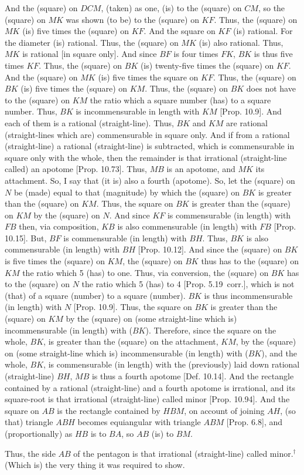 \begin{Parallel}{}{}
{And the (square) on $DCM$, (taken) as one,  (is)  to the (square) on $CM$, so the (square) on $MK$ was shown (to be) to the (square) on 
$KF$.  Thus, the (square) on $MK$ (is) five times the (square) on 
$KF$. And the square on $KF$ (is) rational. For the diameter
(is) rational. Thus, the (square) on $MK$ (is) also rational. 
Thus, $MK$ is rational [in square only]. And since $BF$ is four times
$FK$, $BK$ is thus five times $KF$. Thus, the (square) on $BK$
(is) twenty-five times the (square) on $KF$.  And the (square) on $MK$
(is) five times the square on $KF$. Thus, the (square) on $BK$ (is) five
times the (square) on $KM$.  Thus, the (square) on $BK$ does not
have to the (square) on $KM$ the ratio which a square number (has) to
a square number. Thus, $BK$ is incommensurable in length with $KM$ [Prop. 10.9].
And each of them is a rational (straight-line).  Thus, $BK$ and $KM$ are rational
(straight-lines which are) commensurable in square only. And if from a rational (straight-line)
a rational (straight-line) is subtracted, which is commensurable in square
only with the whole, then the remainder is that irrational (straight-line
called) an apotome [Prop. 10.73]. Thus, $MB$ is an apotome, and $MK$ its attachment. So, I say that (it is) also a fourth (apotome). So, let the
(square) on $N$ be (made) equal to that (magnitude) by which the (square)
on $BK$ is greater than the (square) on $KM$. Thus, the
square on $BK$ is greater than the (square) on $KM$ by the (square) on $N$.
And since $KF$ is commensurable (in length) with $FB$ then, via composition, 
$KB$ is also commensurable (in length) with $FB$ [Prop. 10.15]. But, $BF$ is commensurable (in length)
with $BH$. Thus, $BK$ is also commensurable (in length) with $BH$ [Prop. 10.12]. And since the
(square) on $BK$ is five times the (square) on $KM$, the (square) on $BK$
thus has to the (square) on $KM$ the ratio which 5 (has) to one. Thus, via
conversion, the (square) on $BK$ has to the (square) on $N$ the ratio
which 5 (has) to 4 [Prop. 5.19~corr.], which is not (that) of a
square (number) to a square (number). $BK$ is thus incommensurable (in length)
with $N$ [Prop. 10.9]. Thus, the square on $BK$ is greater than
the (square) on $KM$ by the (square) on (some straight-line which is) incommensurable (in length) with ($BK$). Therefore, since the square on the whole,
$BK$, is greater than the (square) on the attachment, $KM$, by the
(square) on (some straight-line which is) incommensurable (in length) with ($BK$),
and the whole, $BK$, is commensurable (in length) with the (previously) laid down
rational (straight-line) $BH$, $MB$ is thus a fourth apotome
[Def. 10.14]. And the rectangle contained by a rational (straight-line)
and a fourth apotome is irrational, and its square-root is that irrational
(straight-line) called minor [Prop. 10.94]. And the square on $AB$
is the rectangle contained by $HBM$, on account of joining $AH$, (so that)
triangle $ABH$ becomes equiangular  with triangle $ABM$ [Prop. 6.8], and (proportionally) as
$HB$ is to $BA$, so $AB$ (is) to $BM$.

Thus, the side $AB$ of the pentagon is that irrational (straight-line)
called minor.$^\dag$ (Which is) the very thing it was required to show.}
\end{Parallel}


